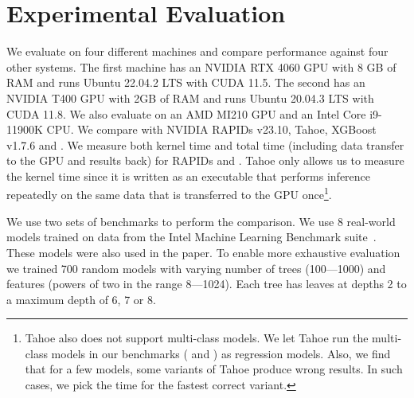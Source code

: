 \section{Experimental Evaluation}
\label{sec:results}

We evaluate \Treebeard{} on four different machines and compare performance against four other systems. The first machine 
has an NVIDIA RTX 4060 GPU with 8 GB of RAM and runs Ubuntu 22.04.2 LTS with CUDA 11.5. The 
second has 
an NVIDIA T400 GPU with 2GB of RAM and runs Ubuntu 20.04.3 LTS with CUDA 11.8. We also evaluate \Treebeard{} on 
an AMD MI210 GPU and an Intel Core i9-11900K CPU. 
We compare \Treebeard{} with NVIDIA RAPIDs v23.10,
Tahoe, XGBoost v1.7.6 and \TreebeardOLD{}. We measure both kernel time and total time (including data transfer 
to the GPU and results back) for RAPIDs and \Treebeard{}.
Tahoe only allows us to measure the kernel time since it is written as an executable that performs inference
repeatedly on the same data that is transferred to the GPU once\footnote{Tahoe also does not support 
multi-class models. We let Tahoe run the multi-class models in our benchmarks ( and )
as regression models. Also, we find that for a few models, some variants of Tahoe produce wrong results. 
In such cases, we pick the time for the fastest correct variant.}.

We use two sets of benchmarks to perform the comparison.
We use 8 real-world models trained on data from the 
Intel Machine Learning Benchmark suite~\cite{MLBenchmarks}. These models were 
also used in the \TreebeardOLD{} paper\cite{Treebeard}.
To enable more exhaustive evaluation we trained 700 random models with varying number 
of trees (100---1000) and features (powers of two in the range 8---1024). Each tree has leaves at depths 2 to a maximum depth of 6, 7 or 8.


